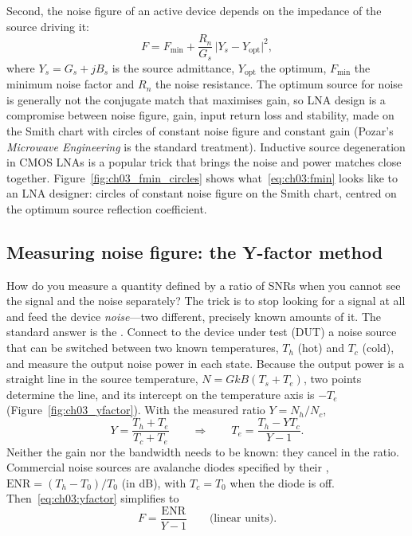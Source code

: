 Second, the noise figure of an active device depends on the impedance of the source driving it:
\begin{equation}
F=F_{\min}+\frac{R_n}{G_s}\,\big|Y_s-Y_{\text{opt}}\big|^2,
\label{eq:ch03:fmin}
\end{equation}
where $Y_s=G_s+jB_s$ is the source admittance, $Y_{\text{opt}}$ the optimum, $F_{\min}$ the minimum noise
factor and $R_n$ the noise resistance. The optimum source for noise is generally not the conjugate match
that maximises gain, so LNA design is a compromise between noise figure, gain, input return loss and
stability, made on the Smith chart with circles of constant noise figure and constant gain (Pozar's
\emph{Microwave Engineering} is the standard treatment). Inductive source degeneration in CMOS LNAs is a
popular trick that brings the noise and power matches close together. Figure~\ref{fig:ch03_fmin_circles}
shows what~\eqref{eq:ch03:fmin} looks like to an LNA designer: circles of constant noise figure on the
Smith chart, centred on the optimum source reflection coefficient.


\subsection{Measuring noise figure: the Y-factor method}
\label{sec:ch03:yfactor}

How do you measure a quantity defined by a ratio of SNRs when you cannot see the signal and the noise
separately? The trick is to stop looking for a signal at all and feed the device \emph{noise}---two
different, precisely known amounts of it. The standard answer is the . Connect to
the device under test (DUT) a noise source that can be switched between two known temperatures, $T_h$
(hot) and $T_c$ (cold), and measure the output noise power in each state. Because the output power is a
straight line in the source temperature, $N=GkB(T_s+T_e)$, two points determine the line, and its
intercept on the temperature axis is $-T_e$ (Figure~\ref{fig:ch03_yfactor}). With the measured ratio
$Y=N_h/N_c$,
\begin{equation}
Y=\frac{T_h+T_e}{T_c+T_e}\qquad\Longrightarrow\qquad T_e=\frac{T_h-YT_c}{Y-1}.
\label{eq:ch03:yfactor}
\end{equation}
Neither the gain nor the bandwidth needs to be known: they cancel in the ratio. Commercial noise sources
are avalanche diodes specified by their , $\mathrm{ENR}=(T_h-T_0)/T_0$ (in dB),
with $T_c=T_0$ when the diode is off. Then~\eqref{eq:ch03:yfactor} simplifies to
\begin{equation}
F=\frac{\mathrm{ENR}}{Y-1}\qquad\text{(linear units)}.
\end{equation}


